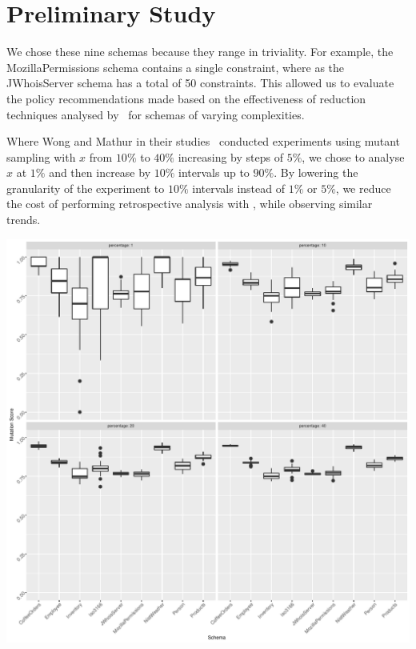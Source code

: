 \section{Preliminary Study}




We chose these nine schemas because they range in triviality. For example, the MozillaPermissions schema contains a
single constraint, where as the JWhoisServer schema has a total of 50 constraints. This allowed us to evaluate the
policy recommendations made based on the effectiveness of reduction techniques analysed by \mr~for schemas of varying
complexities.

Where Wong and Mathur in their studies~\cite{mathur1994empirical, wong1993mutation} conducted experiments using mutant
sampling with $x$ from $10\%$ to $40\%$ increasing by steps of $5\%$, we chose to analyse $x$ at $1\%$ and then increase
by $10\%$ intervals up to $90\%$. By lowering the granularity of the experiment to $10\%$ intervals instead of $1\%$ or
$5\%$, we reduce the cost of performing retrospective analysis with \mr, while observing similar trends.

\hspace*{-1em}\includegraphics[scale = 0.5]{graphs/schema_vs_ms.pdf}
